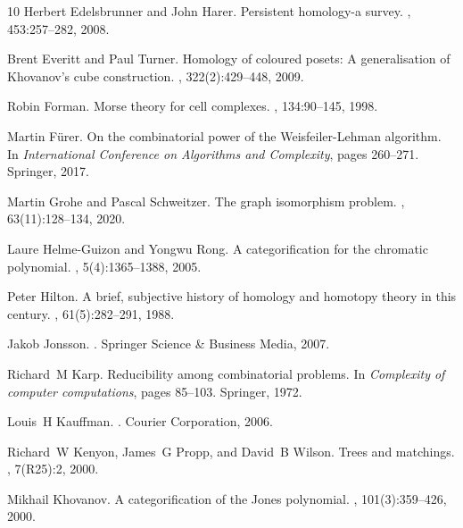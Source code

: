 \documentclass[11pt, a4paper, reqno, twoside, makeidx]{amsart}
\theoremstyle{remark}
\theoremstyle{plain}
\theoremstyle{definition}
\begin{document}
\begin{thebibliography}{10}
Herbert Edelsbrunner and John Harer.
\newblock Persistent homology-a survey.
, 453:257--282, 2008.

Brent Everitt and Paul Turner.
\newblock Homology of coloured posets: A generalisation of {K}hovanov's cube
  construction.
, 322(2):429--448, 2009.

Robin Forman.
\newblock Morse theory for cell complexes.
, 134:90--145, 1998.

Martin F{\"u}rer.
\newblock On the combinatorial power of the {W}eisfeiler-{L}ehman algorithm.
\newblock In {\em International Conference on Algorithms and Complexity}, pages
  260--271. Springer, 2017.

Martin Grohe and Pascal Schweitzer.
\newblock The graph isomorphism problem.
, 63(11):128--134, 2020.

Laure Helme-Guizon and Yongwu Rong.
\newblock A categorification for the chromatic polynomial.
, 5(4):1365--1388, 2005.

Peter Hilton.
\newblock A brief, subjective history of homology and homotopy theory in this
  century.
, 61(5):282--291, 1988.

Jakob Jonsson.
.
\newblock Springer Science \& Business Media, 2007.

Richard~M Karp.
\newblock Reducibility among combinatorial problems.
\newblock In {\em Complexity of computer computations}, pages 85--103.
  Springer, 1972.

Louis~H Kauffman.
.
\newblock Courier Corporation, 2006.

Richard~W Kenyon, James~G Propp, and David~B Wilson.
\newblock Trees and matchings.
, 7(R25):2, 2000.

Mikhail Khovanov.
\newblock A categorification of the {J}ones polynomial.
, 101(3):359--426, 2000.


\end{thebibliography}
\end{document}
